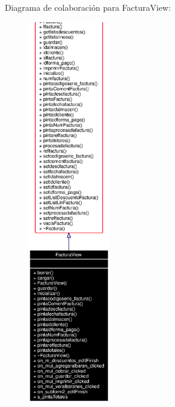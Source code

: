 Diagrama de colaboraci\'{o}n para Factura\-View:\begin{figure}[H]
\begin{center}
\leavevmode
\includegraphics[width=101pt]{classFacturaView__coll__graph}
\end{center}
\end{figure}
